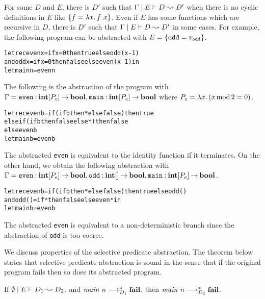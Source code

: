 For some $D$ and $E$, there is $D'$ such that
${\Gamma} \mid {E} \vdash {D} \leadsto {D'}$ when there is no cyclic definitions in $E$
like $\{{f = \lambda{x}.\,{{f}~{x}}}\}$.
Even if $E$ has some functions which are recursive in $D$,
there is $D'$ such that ${\Gamma} \mid {E} \vdash {D} \leadsto {D'}$ in some cases.
For example, the following program can be abstracted with $E = \{{\mathtt{odd} = v_\mathtt{odd}}\}$.
\begin{alltt}
let rec even x = if x = 0 then true else odd (x-1)
    and odd x = if x = 0 then false else even (x-1) in
let main n = even n
\end{alltt}
The following is the abstraction of the program with $\Gamma =
\mathtt{even}\mathbin{:}{\mathbf{int}[P_e]}\mathbin{\rightarrow}{\mathbf{bool}},
\mathtt{main}\mathbin{:}{\mathbf{int}[P_e]}\mathbin{\rightarrow}{\mathbf{bool}}$ where $P_e = \lambda{x}.\,{(x
\mathop{\mathrm{mod}} 2 = 0})$.
\begin{alltt}
let rec even b = if (if b then * else false) then true
                 else if (if b then false else *) then false
                 else even b
let main b = even b
\end{alltt}
The abstracted \texttt{even} is equivalent to the identity function if
it terminates.  On the other hand, we obtain the following abstraction
with $\Gamma = \mathtt{even}\mathbin{:}{\mathbf{int}[P_e]}\mathbin{\rightarrow}{\mathbf{bool}},
\mathtt{odd}\mathbin{:}{\mathbf{int}[]}\mathbin{\rightarrow}{\mathbf{bool}},
\mathtt{main}\mathbin{:}{\mathbf{int}[P_e]}\mathbin{\rightarrow}{\mathbf{bool}}$.
\begin{alltt}
let rec even b = if (if b then * else false) then true else odd ()
    and odd () = if * then false else even * in
let main b = even b
\end{alltt}
The abstracted \texttt{even} is equivalent to a non-deterministic branch
since the abstraction of \texttt{odd} is too coerce.

We discuss properties of the selective predicate abstraction.
The theorem below states that selective predicate abstraction is sound
in the sense that if the original program fails then so does its
abstracted program.
\begin{theorem}[soundness]
 If ${\emptyset} \mid {E} \vdash {D_1} \leadsto {D_2}$, and
 ${\mathit{main}}~{n} \longrightarrow_{D_1}^* \mathbf{fail}$, then
 ${\mathit{main}}~{n} \longrightarrow_{D_2}^* \mathbf{fail}$.
\end{theorem}


